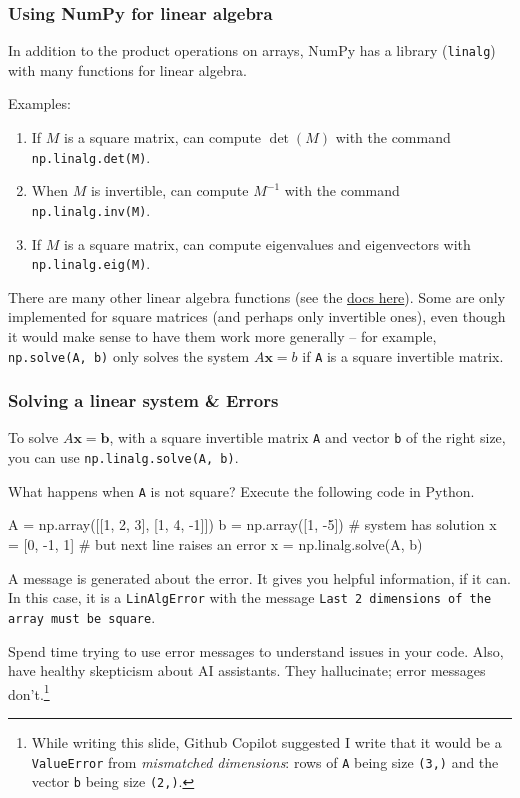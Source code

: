 \documentclass{beamer}
\newenvironment{codeblock}
    {\hfill\begin{beamerboxesrounded}[lower=codecol, width=0.8\textwidth]
    \medskip

    }
    { 
    \end{beamerboxesrounded}\hfill
    }
\theoremstyle{example}
\newcommand{\ttt}[1]{{\small\texttt{#1}}}
\begin{document}
\begin{frame}
\frametitle{Using NumPy for linear algebra}
In addition to the product operations on arrays, NumPy has a library (\ttt{linalg}) with many functions for linear algebra. 

\pause
Examples: 
\begin{enumerate}
    \item If $M$ is a square matrix, can compute $\det(M)$ with the command \ttt{np.linalg.det(M)}.
    \pause
    \item When $M$ is invertible, can compute $M^{-1}$ with the command \ttt{np.linalg.inv(M)}.
    \pause
    \item If $M$ is a square matrix, can compute eigenvalues and eigenvectors with \ttt{np.linalg.eig(M)}. 
\end{enumerate}

\pause
There are many other linear algebra functions (see the \href{https://numpy.org/doc/stable/reference/routines.linalg.html}{docs here}). Some are only implemented for square matrices (and perhaps only invertible ones), even though it would make sense to have them work more generally {--} for example, \ttt{np.solve(A, b)} only solves the system $A\mathbf{x} = b$ if \ttt{A} is a square invertible matrix.
\end{frame}

\begin{frame}[fragile]
\frametitle{Solving a linear system \& Errors}
To solve $A\mathbf{x} = \mathbf{b}$, with a square invertible matrix \ttt{A} and vector \ttt{b} of the right size, you can use \ttt{np.linalg.solve(A, b)}.

\pause
What happens when \ttt{A} is not square? Execute the following code in Python.

\begin{codeblock}

\begin{python}
    A = np.array([[1, 2, 3], [1, 4, -1]])
    b = np.array([1, -5])
    # system has solution x = [0, -1, 1]
    # but next line raises an error
    x = np.linalg.solve(A, b)
\end{python}

\end{codeblock}

\pause
A message is generated about the error. It gives you helpful information, if it can. In this case, it is a \ttt{LinAlgError} with the message \ttt{Last 2 dimensions of the array must be square}.

\pause
Spend time trying to use error messages to understand issues in your code. Also, have healthy skepticism about AI assistants. They hallucinate; error messages don't.\footnote{While writing this slide, Github Copilot suggested I write that it would be a \ttt{ValueError} from \emph{mismatched dimensions}: rows of \ttt{A} being size \ttt{(3,)} and the vector \ttt{b} being size \ttt{(2,)}.}
\end{frame}
\end{document}
